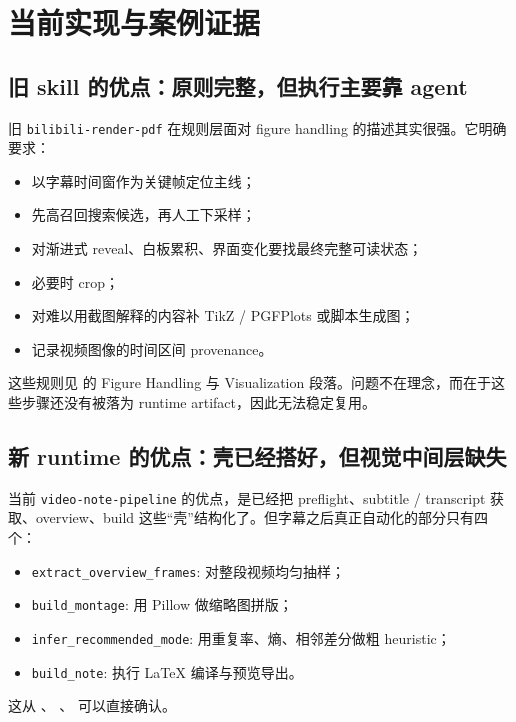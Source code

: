 \documentclass[a4paper]{article}
\begin{document}
\section{当前实现与案例证据}

\subsection{旧 skill 的优点：原则完整，但执行主要靠 agent}

旧 \texttt{bilibili-render-pdf} 在规则层面对 figure handling 的描述其实很强。它明确要求：

\begin{itemize}
\item 以字幕时间窗作为关键帧定位主线；
\item 先高召回搜索候选，再人工下采样；
\item 对渐进式 reveal、白板累积、界面变化要找最终完整可读状态；
\item 必要时 crop；
\item 对难以用截图解释的内容补 TikZ / PGFPlots 或脚本生成图；
\item 记录视频图像的时间区间 provenance。
\end{itemize}

这些规则见  的 Figure Handling 与 Visualization 段落。问题不在理念，而在于这些步骤还没有被落为 runtime artifact，因此无法稳定复用。

\subsection{新 runtime 的优点：壳已经搭好，但视觉中间层缺失}

当前 \texttt{video-note-pipeline} 的优点，是已经把 preflight、subtitle / transcript 获取、overview、build 这些“壳”结构化了。但字幕之后真正自动化的部分只有四个：

\begin{itemize}
\item \texttt{extract\_overview\_frames}: 对整段视频均匀抽样；
\item \texttt{build\_montage}: 用 Pillow 做缩略图拼版；
\item \texttt{infer\_recommended\_mode}: 用重复率、熵、相邻差分做粗 heuristic；
\item \texttt{build\_note}: 执行 LaTeX 编译与预览导出。
\end{itemize}

这从 、
、
 可以直接确认。
\end{document}
